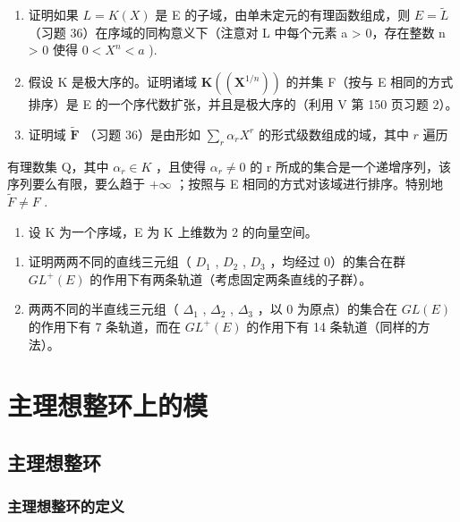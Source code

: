\begin{enumerate}
\def\labelenumi{\alph{enumi})}
\item
  证明如果 \(L = K(X)\) 是 E 的子域，由单未定元的有理函数组成，则 \(E = \tilde{L}\) （习题 36）在序域的同构意义下（注意对 L 中每个元素 a \textgreater{} 0，存在整数 n \textgreater{} 0 使得 \(0 < X^{n} < a\) ).
\item
  假设 K 是极大序的。证明诸域 \(\mathbf{K}((\mathbf{X}^{1/n}))\) 的并集 F（按与 E 相同的方式排序）是 E 的一个序代数扩张，并且是极大序的（利用 V 第 150 页习题 2）。
\item
  证明域 \(\widetilde{\mathbf{F}}\) （习题 36）是由形如 \(\sum_{r} \alpha_r X^r\) 的形式级数组成的域，其中 \(r\) 遍历
\end{enumerate}

有理数集 Q，其中 \(\alpha_{r} \in K\) ，且使得 \(\alpha_{r} \neq 0\) 的 r 所成的集合是一个递增序列，该序列要么有限，要么趋于 \(+\infty\) ；按照与 E 相同的方式对该域进行排序。特别地 \(\widetilde{F} \neq F\) .

\begin{enumerate}
\def\labelenumi{\arabic{enumi})}
\setcounter{enumi}{40}
\tightlist
\item
  设 K 为一个序域，E 为 K 上维数为 2 的向量空间。
\end{enumerate}

\begin{enumerate}
\def\labelenumi{\alph{enumi})}
\item
  证明两两不同的直线三元组（ \(D_{1}\) , \(D_{2}\) , \(D_{3}\) ，均经过 0）的集合在群 \(GL^{+}(E)\) 的作用下有两条轨道（考虑固定两条直线的子群）。
\item
  两两不同的半直线三元组（ \(\Delta_{1}\) , \(\Delta_{2}\) , \(\Delta_{3}\) ，以 0 为原点）的集合在 \(GL(E)\) 的作用下有 7 条轨道，而在 \(GL^{+}(E)\) 的作用下有 14 条轨道（同样的方法）。
\end{enumerate}

\chapter{主理想整环上的模}

\section{主理想整环}

\subsection{主理想整环的定义}

